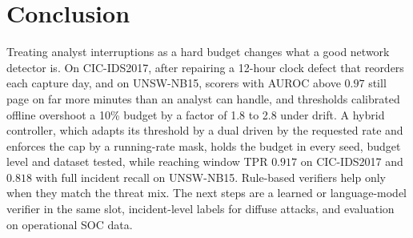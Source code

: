\documentclass[journal,10pt,twocolumn]{IEEEtran}
\begin{document}
\section{Conclusion}
Treating analyst interruptions as a hard budget changes what a good network detector is. On CIC-IDS2017, after repairing a 12-hour clock defect that reorders each capture day, and on UNSW-NB15, scorers with AUROC above $0.97$ still page on far more minutes than an analyst can handle, and thresholds calibrated offline overshoot a 10\% budget by a factor of 1.8 to 2.8 under drift. A hybrid controller, which adapts its threshold by a dual driven by the requested rate and enforces the cap by a running-rate mask, holds the budget in every seed, budget level and dataset tested, while reaching window TPR $0.917$ on CIC-IDS2017 and $0.818$ with full incident recall on UNSW-NB15. Rule-based verifiers help only when they match the threat mix. The next steps are a learned or language-model verifier in the same slot, incident-level labels for diffuse attacks, and evaluation on operational SOC data.
\end{document}
